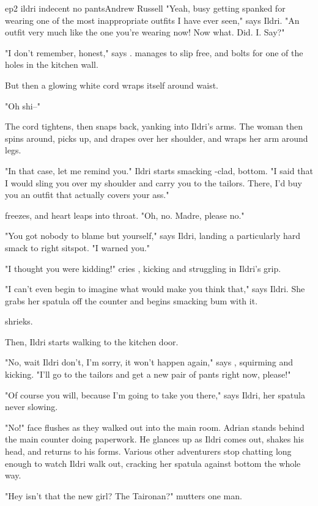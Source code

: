 \documentclass{book}
\begin{document}
\begin{childnode}{ep2 ildri indecent no pants}{Andrew Russell}
"Yeah, busy getting spanked for wearing one of the most inappropriate outfits I have ever seen," says Ildri. "An outfit very much like the one you're wearing now! Now what. Did. I. Say?"

"I don't remember, honest," says \name{}. \HeShe{} manages to slip free, and bolts for one of the holes in the kitchen wall.

But then a glowing white cord wraps itself around \names{} waist.

"Oh shi--"

The cord tightens, then snaps back, yanking \name{} into Ildri's arms. The woman then spins \name{} around, picks \himher{} up, and drapes \himher{} over her shoulder, and wraps her arm around
\names{} legs.

"In that case, let me remind you." Ildri starts smacking \names{} \trousers{}-clad, \bumadj{} bottom. "I said that I would sling you over my shoulder and carry you to the tailors. There, I'd buy
you an outfit that actually covers your ass."

\name{} freezes, and \hisher{} heart leaps into \hisher{} throat. "Oh, no. Madre, please no."

"You got nobody to blame but yourself," says Ildri, landing a particularly hard smack to \names{} right sitspot. "I warned you."

"I thought you were kidding!" cries \name{}, kicking and struggling in Ildri's grip.

"I can't even begin to imagine what would make you think that," says Ildri. She grabs her spatula off the counter and begins smacking \names{} \muscleadj{} bum with it.

\name{} shrieks.

Then, Ildri starts walking to the kitchen door.

"No, wait Ildri don't, I'm sorry, it won't happen again," says \name{}, squirming and kicking. "I'll go to the tailors and get a new pair of pants right now, please!"

"Of course you will, because I'm going to take you there," says Ildri, her spatula never slowing.

"No!" \names{} face flushes as they walked out into the main room. Adrian stands behind the main counter doing paperwork. He glances up as Ildri comes out, shakes his head, and returns to
his forms. Various other adventurers stop chatting long enough to watch Ildri walk out, cracking her spatula against \names{} bottom the whole way.

"Hey isn't that the new girl? The Taironan?" mutters one man.


\end{childnode}
\end{document}
